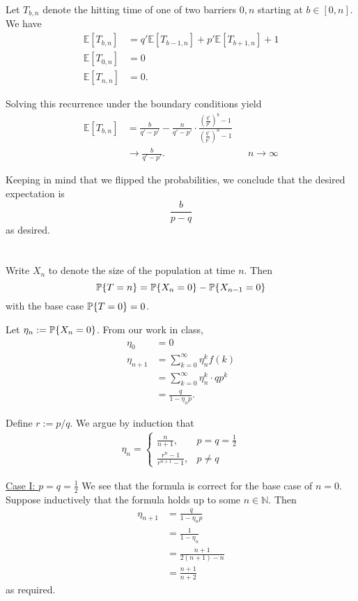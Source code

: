 \documentclass[10pt]{article}
\DeclarePairedDelimiter{\set}{\lbrace}{\rbrace}
\newcommand{\E}{\mathbb{E}}
\newcommand{\N}{\mathbb{N}}
\renewcommand{\P}{\mathbb{P}}
\begin{document}
Let $T_{b, n}$ denote the hitting time of one of two barriers $0, n$
starting at $b\in [0, n]$.
We have
\begin{align*}
  \E[T_{b, n}]
  &= q'\E[T_{b-1, n}] + p'\E[T_{b+1, n}] + 1 \\
  \E[T_{0, n}] &= 0 \\
  \E[T_{n, n}] &= 0.
\end{align*}

Solving this recurrence under the boundary conditions yield
\begin{align*}
  \E[T_{b, n}]
  &= \frac{b}{q'-p'} - \frac{n}{q'-p'}\cdot \frac{\left( \frac{q'}{p'} \right)^b - 1}{\left( \frac{q'}{p'} \right)^n - 1} \\
  &\to \frac{b}{q'-p'}. &&n\to \infty
\end{align*}

Keeping in mind that we flipped the probabilities,
we conclude that the desired expectation is
\[
  \frac{b}{p-q}
\]
as desired.

\clearpage
\section{}
Write $X_n$ to denote the size of the population at time $n$.
Then
\[
  \P\set{T=n} = \P\set{X_n=0} - \P\set{X_{n-1}=0}
\]
with the base case $\P\set{T=0} = 0$.

Let $\eta_n := \P\set{X_n=0}$.
From our work in class,
\begin{align*}
  \eta_0 &= 0 \\
  \eta_{n+1}
  &= \sum_{k=0}^\infty \eta_n^k f(k) \\
  &= \sum_{k=0}^\infty \eta_n^k\cdot qp^k \\
  &= \frac{q}{1-\eta_n p}.
\end{align*}

Define $r := p/q$.
We argue by induction that
\begin{align*}
  \eta_n =
  \begin{cases}
    \frac{n}{n+1}, &p=q=\frac12 \\
    \frac{r^n-1}{r^{n+1}-1}, &p\neq q
  \end{cases}
\end{align*}

\underline{Case I: $p=q=\frac12$}
We see that the formula is correct for the base case of $n=0$.
Suppose inductively that the formula holds up to some $n\in \N$.
Then
\begin{align*}
  \eta_{n+1}
  &= \frac{q}{1-\eta_n p} \\
  &= \frac{1}{1-\eta_n} \\
  &= \frac{n+1}{2(n+1) - n} \\
  &= \frac{n+1}{n+2}
\end{align*}
as required.
\end{document}

